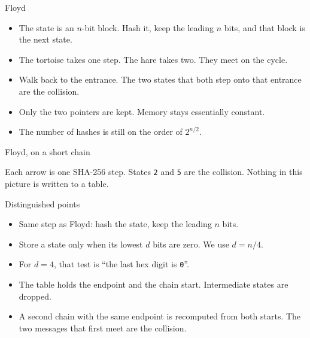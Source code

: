 \documentclass[aspectratio=169,11pt]{beamer}
\begin{document}
\begin{frame}{Floyd}
  \begin{itemize}
    \item The state is an \(n\)-bit block. Hash it, keep the leading \(n\) bits, and that block is the next state.
    \item The tortoise takes one step. The hare takes two. They meet on the cycle.
    \item Walk back to the entrance. The two states that both step onto that entrance are the collision.
    \item Only the two pointers are kept. Memory stays essentially constant.
    \item The number of hashes is still on the order of \(2^{n/2}\).
  \end{itemize}
\end{frame}

\begin{frame}{Floyd, on a short chain}
  \begin{center}
  \end{center}
  Each arrow is one SHA-256 step. States \texttt{2} and \texttt{5} are the collision. Nothing in this picture is written to a table.
\end{frame}

\begin{frame}{Distinguished points}
  \begin{itemize}
    \item Same step as Floyd: hash the state, keep the leading \(n\) bits.
    \item Store a state only when its lowest \(d\) bits are zero. We use \(d = n/4\).
    \item For \(d = 4\), that test is ``the last hex digit is \texttt{0}''.
    \item The table holds the endpoint and the chain start. Intermediate states are dropped.
    \item A second chain with the same endpoint is recomputed from both starts. The two messages that first meet are the collision.
  \end{itemize}
\end{frame}
\end{document}
